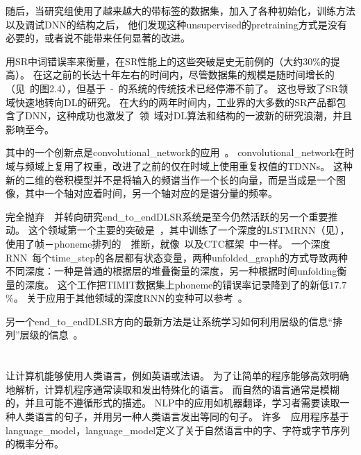 随后，当研究组使用了越来越大的带标签的数据集，加入了各种初始化，训练方法以及调试\gls{DNN}的结构之后，
他们发现这种\gls{unsupervised}的\gls{pretraining}方式是没有必要的，或者说不能带来任何显著的改进。

用\gls{SR}中词错误率来衡量，在\gls{SR}性能上的这些突破是史无前例的（大约$30$\%的提高）。
在这之前的长达十年左右的时间内，尽管数据集的规模是随时间增长的（见~\citet{Deng+Yu-2014}的图2.4），但基于~-~的系统的传统技术已经停滞不前了。
这也导致了\gls{SR}领域快速地转向\gls{DL}的研究。
在大约的两年时间内，工业界的大多数的\gls{SR}产品都包含了\gls{DNN}，这种成功也激发了~领~域对\gls{DL}算法和结构的一波新的研究浪潮，并且影响至今。

其中的一个创新点是\gls{convolutional_network}的应用~\citep{Sainath-et-al-ICASSP2013}。
\gls{convolutional_network}在时域与频域上复用了权重，改进了之前的仅在时域上使用重复权值的\gls{TDNNs}。
这种新的二维的卷积模型并不是将输入的频谱当作一个长的向量，而是当成是一个图像，其中一个轴对应着时间，另一个轴对应的是谱分量的频率。

完全抛弃~~并转向研究\gls{end_to_end}\gls{DL}\gls{SR}系统是至今仍然活跃的另一个重要推动。
这个领域第一个主要的突破是~\citet{Graves-et-al-ICASSP2013}，其中训练了一个深度的\gls{LSTM}\gls{RNN}（见），使用了帧－\gls{phoneme}排列的~~推断，就像~\citet{chapter-gradient-document-2001}以及CTC框架~\citep{Graves-et-al-2006,Graves-book2012}中一样。
一个深度\gls{RNN}~\citep{Graves-et-al-ICASSP2013}每个\gls{time_step}的各层都有状态变量，两种\gls{unfolded_graph}的方式导致两种不同深度：一种是普通的根据层的堆叠衡量的深度，另一种根据时间\gls{unfolding}衡量的深度。
这个工作把TIMIT数据集上\gls{phoneme}的错误率记录降到了的新低$17.7$\%。
关于应用于其他领域的深度\gls{RNN}的变种可以参考~\citet{Pascanu-et-al-ICLR2014,Chung-et-al-NIPSDL2014-small}。

另一个\gls{end_to_end}\gls{DL}\gls{SR}方向的最新方法是让系统学习如何利用层级的信息``排列''层级的信息~\citep{Chorowski-et-al-arxiv2014,llu_is2015b}。


\section{}
\label{sec: natural_language_processing}

让计算机能够使用人类语言，例如英语或法语。
为了让简单的程序能够高效明确地解析，计算机程序通常读取和发出特殊化的语言。
而自然的语言通常是模糊的，并且可能不遵循形式的描述。
\gls{NLP}中的应用如机器翻译，学习者需要读取一种人类语言的句子，并用另一种人类语言发出等同的句子。
许多~~应用程序基于\gls{language_model}，\gls{language_model}定义了关于自然语言中的字、字符或字节序列的概率分布。


